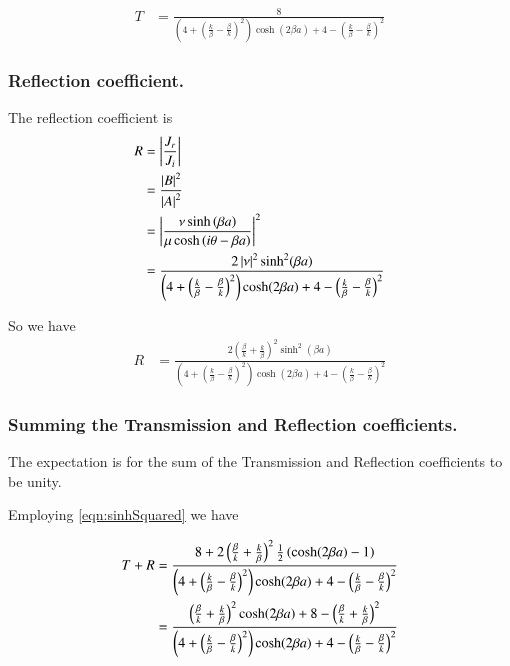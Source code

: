 \documentclass{article}
\begin{document}
\begin{align}\label{eqn:Tcoeff1}
T 
&= \frac{8} { 
\left(4 + \left( \frac{k}{\beta} -\frac{\beta}{k} \right)^2 \right)
\cosh(2\beta a)
+ 
4 - \left(\frac{k}{\beta} - \frac{\beta}{k} \right)^2 
}
\end{align}

\subsubsection{ Reflection coefficient. }

The reflection coefficient is
\begin{align*}
R 
&= \left\lvert{\frac{J_r}{J_i}}\right\rvert \\
&= \frac{\left\lvert{B}\right\rvert^2}{\left\lvert{A}\right\rvert^2} \\
&= 
\left\lvert{\frac{\nu \sinh\left( \beta a \right) }
{\mu \cosh\left( i\theta -\beta a \right) }}\right\rvert^2 \\
&= \frac{2 \left\lvert{\nu}\right\rvert^2 \sinh^2( \beta a)} { 
\left(4 + \left( \frac{k}{\beta} -\frac{\beta}{k} \right)^2 \right)
\cosh(2\beta a)
+ 
4 - \left(\frac{k}{\beta} - \frac{\beta}{k} \right)^2 
}
\end{align*}

So we have
\begin{align}\label{eqn:Rcoeff1}
R 
&= \frac{2 
\left(\frac{\beta}{k} + \frac{k}{\beta} \right)^2 
\sinh^2( \beta a)} { 
\left(4 + \left( \frac{k}{\beta} -\frac{\beta}{k} \right)^2 \right)
\cosh(2\beta a)
+ 
4 - \left(\frac{k}{\beta} - \frac{\beta}{k} \right)^2 
}
\end{align}

\subsubsection{ Summing the Transmission and Reflection coefficients. }

The expectation is for the 
sum of the Transmission and Reflection coefficients to be unity.

Employing \ref{eqn:sinhSquared} we have

\begin{align*}
T + R 
&= \frac{8 + 2 
\left(\frac{\beta}{k} + \frac{k}{\beta} \right)^2 
\frac{1}{2} \left( \cosh(2 \beta a) -1 \right) 
} { 
\left(4 + \left( \frac{k}{\beta} -\frac{\beta}{k} \right)^2 \right)
\cosh(2\beta a)
+ 
4 - \left(\frac{k}{\beta} - \frac{\beta}{k} \right)^2 
} \\
&= \frac{ 
\left(\frac{\beta}{k} + \frac{k}{\beta} \right)^2 
\cosh(2 \beta a) + 8 - \left(\frac{\beta}{k} + \frac{k}{\beta} \right)^2 
} { 
\left(4 + \left( \frac{k}{\beta} -\frac{\beta}{k} \right)^2 \right)
\cosh(2\beta a)
+ 
4 - \left(\frac{k}{\beta} - \frac{\beta}{k} \right)^2 
} \\
\end{align*}
\end{document}
